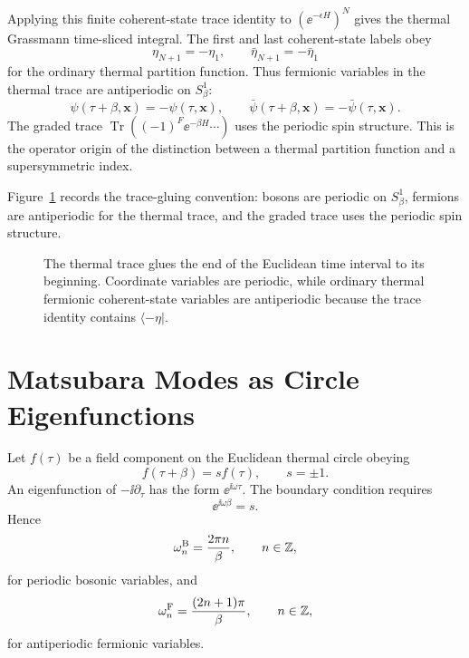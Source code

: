 Applying this finite coherent-state trace identity to
\((\ee^{-\epsilon H})^N\) gives the thermal Grassmann time-sliced integral.
The first and last coherent-state labels obey
\[
  \eta_{N+1}=-\eta_1,\qquad
  \bar\eta_{N+1}=-\bar\eta_1
\]
for the ordinary thermal partition function.  Thus fermionic variables in
the thermal trace are antiperiodic on \(S^1_\beta\):
\[
  \psi(\tau+\beta,\mathbf x)=-\psi(\tau,\mathbf x),
  \qquad
  \bar\psi(\tau+\beta,\mathbf x)=-\bar\psi(\tau,\mathbf x).
\]
The graded trace \(\operatorname{Tr}((-1)^F\ee^{-\beta H}\cdots)\) uses the
periodic spin structure.  This is the operator origin of the distinction
between a thermal partition function and a supersymmetric index.

Figure~\ref{fig:thermal-trace-spin-structure} records the trace-gluing
convention: bosons are periodic on \(S^1_\beta\), fermions are antiperiodic for
the thermal trace, and the graded trace uses the periodic spin structure.

\begin{figure}[H]
\centering
{}
\caption{The thermal trace glues the end of the Euclidean time interval to
its beginning.  Coordinate variables are periodic, while ordinary thermal
fermionic coherent-state variables are antiperiodic because the trace
identity contains \(\langle-\eta|\).}
\label{fig:thermal-trace-spin-structure}
\end{figure}

\section{Matsubara Modes as Circle Eigenfunctions}

Let \(f(\tau)\) be a field component on the Euclidean thermal circle obeying
\[
  f(\tau+\beta)=s f(\tau),\qquad s=\pm1.
\]
An eigenfunction of \(-\ii\partial_\tau\) has the form
\(\ee^{\ii\omega\tau}\).  The boundary condition requires
\[
  \ee^{\ii\omega\beta}=s .
\]
Hence
\[
  \omega_n^{\rm B}=\frac{2\pi n}{\beta},
  \qquad n\in\mathbb Z,
\]
for periodic bosonic variables, and
\[
  \omega_n^{\rm F}=\frac{(2n+1)\pi}{\beta},
  \qquad n\in\mathbb Z,
\]
for antiperiodic fermionic variables.

